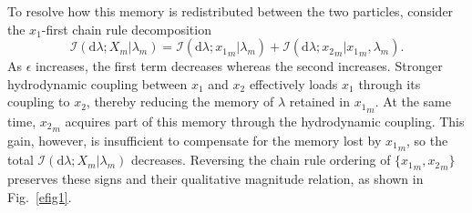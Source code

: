 \documentclass[
 longbibliography,
 twocolumn,
 superscriptaddress,
 amsmath,
 amssymb,
 amsthm,
 amsfonts,
 prl,
 floatfix,
]{revtex4-2}
\begin{document}
To resolve how this memory is redistributed between the two particles, consider the $x_1$-first chain rule decomposition
\begin{equation*}
    \mathcal I(\mathrm d\lambda;X_m|\lambda_m)
    =\mathcal I(\mathrm d\lambda;{x_1}_m|\lambda_m)
    +\mathcal I(\mathrm d\lambda;{x_2}_m|{x_1}_m,\lambda_m).
\end{equation*}
As $\epsilon$ increases, the first term decreases whereas the second increases. Stronger hydrodynamic coupling between $x_1$ and $x_2$ effectively loads $x_1$ through its coupling to $x_2$, thereby reducing the memory of $\lambda$ retained in ${x_1}_m$.
At the same time, ${x_2}_m$ acquires part of this memory through the hydrodynamic coupling. This gain, however, is insufficient to compensate for the memory lost by ${x_1}_m$, so the total $\mathcal I(\mathrm d\lambda;X_m|\lambda_m)$ decreases. Reversing the chain rule ordering of $\{{x_1}_m,{x_2}_m\}$ preserves these signs and their qualitative magnitude relation, as shown in Fig.~\ref{efig1}.


\makeatletter
\let\@hangfrom@section\saved@hangfrom@section
\let\@sectioncntformat\saved@sectioncntformat
\let\thesection\saved@thesection
\let\thesubsection\saved@thesubsection
\let\thesubsubsection\saved@thesubsubsection
\let\cl@section\saved@cl@section
\let\theequation@prefix\saved@theequation@prefix
{}
\makeatother
\end{document}
